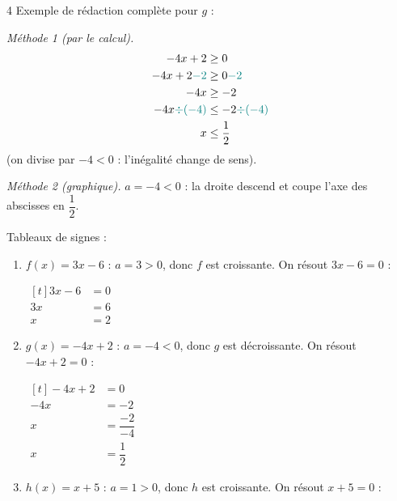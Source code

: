 \documentclass[10pt,a4paper]{article}
\begin{document}
\begin{corr}{4}
Exemple de rédaction complète pour \(g\) :

\textit{Méthode 1 (par le calcul).}
\[
\begin{aligned}
-4x+2 &\geq 0\\
-4x+2\textcolor{teal}{-2} &\geq 0\textcolor{teal}{-2}\\
-4x &\geq -2\\
-4x\textcolor{teal}{\div(-4)} &\leq -2\textcolor{teal}{\div(-4)}\\
x &\leq \frac{1}{2}
\end{aligned}
\]
(on divise par \(-4<0\) : l'inégalité change de sens).

\textit{Méthode 2 (graphique).} \(a=-4<0\) : la droite descend et coupe l'axe des abscisses en \(\dfrac{1}{2}\).

\medskip

Tableaux de signes :
\begin{enumerate}[label=\alph*)]
    \item \(f(x)=3x-6\) : \(a=3>0\), donc \(f\) est croissante. On résout \(3x-6=0\) :

    \(\begin{aligned}[t] 3x-6&=0\\ 3x&=6\\ x&=2\end{aligned}\)
    \begin{center}
    \end{center}
    \item \(g(x)=-4x+2\) : \(a=-4<0\), donc \(g\) est décroissante. On résout \(-4x+2=0\) :

    \(\begin{aligned}[t] -4x+2&=0\\ -4x&=-2\\ x&=\dfrac{-2}{-4}\\ x&=\dfrac{1}{2}\end{aligned}\)
    \begin{center}
    \end{center}
    \item \(h(x)=x+5\) : \(a=1>0\), donc \(h\) est croissante. On résout \(x+5=0\) :


\end{enumerate}
\end{corr}
\end{document}
